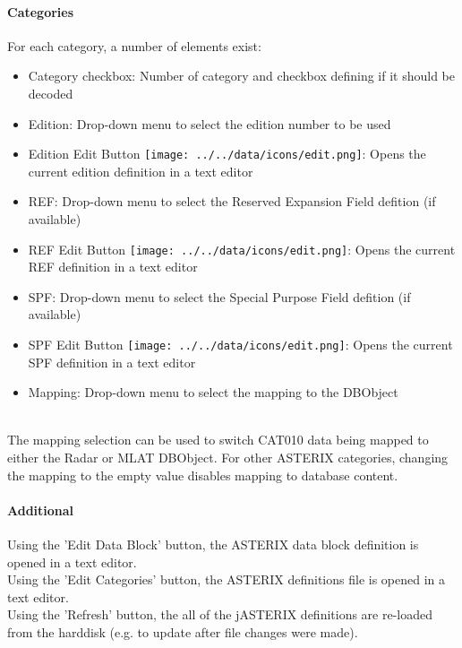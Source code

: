 \paragraph{Categories}

For each category, a number of elements exist:

\begin{itemize}  
\item Category checkbox: Number of category and checkbox defining if it should be decoded
\item Edition: Drop-down menu to select the edition number to be used
\item Edition Edit Button \texttt{[image: ../../data/icons/edit.png]}: Opens the current edition definition in a text editor
\item REF: Drop-down menu to select the Reserved Expansion Field defition (if available)
\item REF Edit Button \texttt{[image: ../../data/icons/edit.png]}: Opens the current REF definition in a text editor
\item SPF: Drop-down menu to select the Special Purpose Field defition (if available)
\item SPF Edit Button \texttt{[image: ../../data/icons/edit.png]}: Opens the current SPF definition in a text editor
\item Mapping: Drop-down menu to select the mapping to the DBObject
\end{itemize}
\ \\

The mapping selection can be used to switch CAT010 data being mapped to either the Radar or MLAT DBObject. For other ASTERIX categories, changing the mapping to the empty value disables mapping to database content.

\paragraph{Additional}

Using the 'Edit Data Block' button, the ASTERIX data block definition is opened in a text editor. \\

Using the 'Edit Categories' button, the ASTERIX definitions file is opened in a text editor. \\

Using the 'Refresh' button, the all of the jASTERIX definitions are re-loaded from the harddisk (e.g. to update after file changes were made). \\

